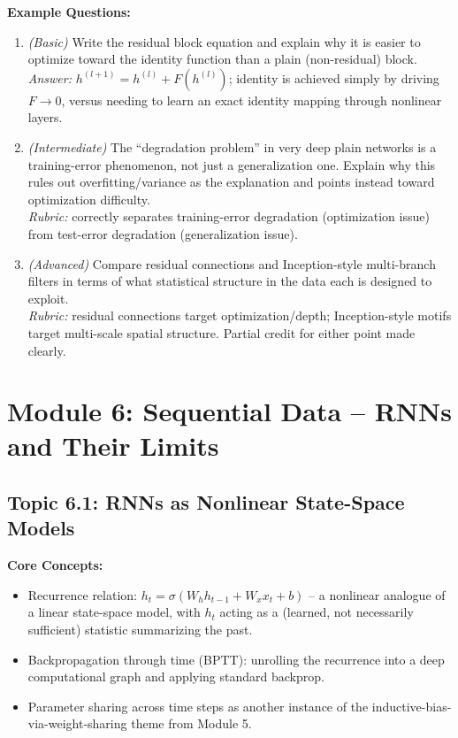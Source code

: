 \documentclass[11pt]{article}
\begin{document}
\textbf{Example Questions:}
\begin{enumerate}
  \item \textit{(Basic)} Write the residual block equation and explain why it is easier to optimize toward the identity function than a plain (non-residual) block. \\
  \textit{Answer:} $h^{(l+1)} = h^{(l)} + F(h^{(l)})$; identity is achieved simply by driving $F \to 0$, versus needing to learn an exact identity mapping through nonlinear layers.
  \item \textit{(Intermediate)} The ``degradation problem'' in very deep plain networks is a training-error phenomenon, not just a generalization one. Explain why this rules out overfitting/variance as the explanation and points instead toward optimization difficulty. \\
  \textit{Rubric:} correctly separates training-error degradation (optimization issue) from test-error degradation (generalization issue).
  \item \textit{(Advanced)} Compare residual connections and Inception-style multi-branch filters in terms of what statistical structure in the data each is designed to exploit. \\
  \textit{Rubric:} residual connections target optimization/depth; Inception-style motifs target multi-scale spatial structure. Partial credit for either point made clearly.
\end{enumerate}

\section{Module 6: Sequential Data -- RNNs and Their Limits}

\subsection{Topic 6.1: RNNs as Nonlinear State-Space Models}

\textbf{Core Concepts:}
\begin{itemize}
  \item Recurrence relation: $h_t = \sigma(W_h h_{t-1} + W_x x_t + b)$ -- a nonlinear analogue of a linear state-space model, with $h_t$ acting as a (learned, not necessarily sufficient) statistic summarizing the past.
  \item Backpropagation through time (BPTT): unrolling the recurrence into a deep computational graph and applying standard backprop.
  \item Parameter sharing across time steps as another instance of the inductive-bias-via-weight-sharing theme from Module 5.
\end{itemize}
\end{document}
